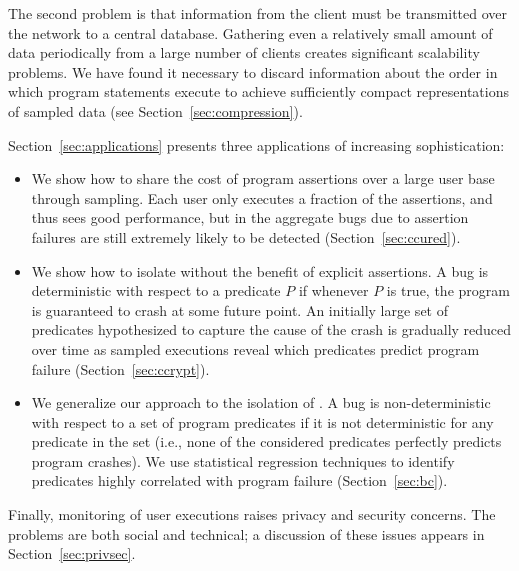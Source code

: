 The second problem is that information from the client must be
transmitted over the network to a central database.  Gathering even a
relatively small amount of data periodically from a large number of
clients creates significant scalability problems.  We have found it
necessary to discard information about the order in which program
statements execute to achieve sufficiently compact representations of
sampled data (see Section~\ref{sec:compression}).

Section~\ref{sec:applications} presents three applications
of increasing sophistication:

\begin{itemize}
\item We show how to share the cost of program assertions over a large
  user base through sampling.  Each user only executes a fraction of
  the assertions, and thus sees good performance, but in the aggregate
  bugs due to assertion failures are still extremely likely to be
  detected (Section~\ref{sec:ccured}).

\item We show how to isolate  without the
  benefit of explicit assertions.  A bug is deterministic with respect
  to a predicate $P$ if whenever $P$ is true, the program is
  guaranteed to crash at some future point.  An initially large set of
  predicates hypothesized to capture the cause of the crash is
  gradually reduced over time as sampled executions reveal which
  predicates predict program failure (Section~\ref{sec:ccrypt}).
  
\item We generalize our approach to the isolation of
  .  A bug is non-deterministic with
  respect to a set of program predicates if it is not deterministic
  for any predicate in the set (i.e., none of the considered
  predicates perfectly predicts program crashes).  We use statistical
  regression techniques to identify predicates highly correlated with
  program failure (Section~\ref{sec:bc}).
\end{itemize}

Finally, monitoring of user executions raises privacy
and security concerns.  The problems are both social and technical; a
discussion of these issues appears in Section~\ref{sec:privsec}.

